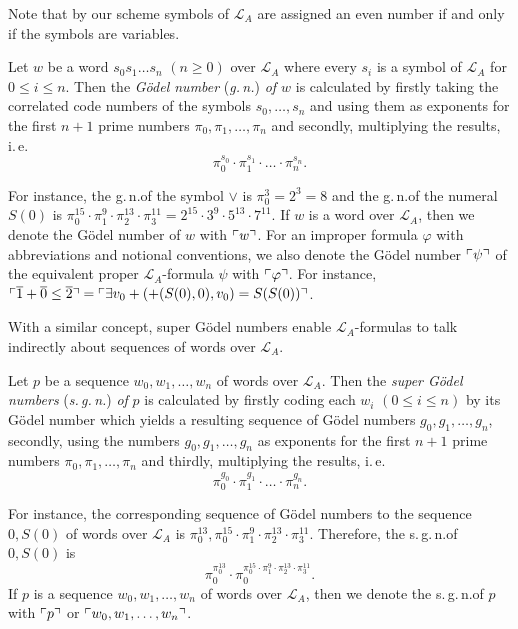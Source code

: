 Note that by our scheme symbols of $\mathcal{L}_A$ are assigned an even number if and only if the symbols are variables. 

\begin{dfn}
Let $w$ be a word $s_0 s_1 \ldots s_n$ $(n \ge 0)$ over $\mathcal{L}_A$ where every $s_i$ is a symbol of $\mathcal{L}_A$ for $ 0 \le i \le n$. Then the \textit{G\"odel number} (\textit{g.\,n.\@}) \textit{of $w$} is calculated by firstly taking the correlated code numbers of the symbols $s_0, \ldots, s_n$ and using them as exponents for the first $n+1$ prime numbers $\pi_0, \pi_1, \ldots, \pi_n$ and secondly, multiplying the results, i.\,e.\@ \[\pi_0^{s_0} \cdot \pi_1^{s_1}\cdot \ldots \cdot \pi_n^{s_n}. \]  
\end{dfn}

For instance, the g.\,n.\@ of the symbol $\vee$ is $\pi_0^3= 2^3=8$ and the g.\,n.\@ of the numeral $S(0)$ is $\pi_0^{15} \cdot \pi_1^{9} \cdot \pi_2^{13}  \cdot \pi_3^{11} = 2^{15} \cdot 3^{9} \cdot 5^{13} \cdot 7^{11}$. If $w$ is a word over $\mathcal{L}_A$, then we denote the G\"odel number of $w$ with $\ulcorner w \urcorner$. For an improper formula $\varphi$ with abbreviations and notional conventions, we also denote the G\"odel number $\ulcorner \psi \urcorner$ of the equivalent proper $\mathcal{L}_A$-formula $\psi$ with $\ulcorner \varphi \urcorner $. For instance, $\ulcorner \overline{1}+\overline{0} \le \overline{2} \urcorner = \ulcorner \exists v_0 +(+(S(0),0),v_0) = S(S(0)) \urcorner$.

With a similar concept, super G\"odel numbers enable $\mathcal{L}_A$-formulas to talk indirectly about sequences of words over $\mathcal{L}_A$.
 
\begin{dfn}
Let $p$ be a sequence $w_0, w_1, \ldots, w_n$ of words over $\mathcal{L}_A$. Then the \textit{super G\"odel numbers} (\textit{s.\,g.\,n.\@}) \textit{of} $p$ is calculated by firstly coding each $w_i$ $(0 \le i \le n)$ by its G\"odel number which yields a resulting sequence of G\"odel numbers $ g_0, g_1, \ldots, g_n$, secondly, using the numbers $g_0, g_1, \ldots, g_n$ as exponents for the first $n+1$ prime numbers $\pi_0, \pi_1, \ldots, \pi_n$ and thirdly, multiplying the results, i.\,e.\@
\[\pi_0^{g_0}\cdot \pi_1^{g_1} \cdot \ldots \cdot \pi_n^{g_n}. \]
\end{dfn}

For instance, the corresponding sequence of G\"odel numbers to the sequence $0, S(0)$ of words over $\mathcal{L}_A$ is $\pi_0^{13}, \pi_0^{15} \cdot \pi_1^{9} \cdot \pi_2^{13}  \cdot \pi_3^{11}$. Therefore, the s.\,g.\,n.\@ of $0, S(0)$ is 
\[ \pi_0^{\pi_0^{13}} \cdot \pi_0^{\pi_0^{15} \cdot \pi_1^{9} \cdot \pi_2^{13}  \cdot \pi_3^{11} }. \]
If $p$ is a sequence $w_0, w_1, \ldots, w_n$ of words over $\mathcal{L}_A$, then we denote the s.\,g.\,n.\@ of $p$ with $\ulcorner p \urcorner$ or $\ulcorner w_0, w_1, \ldots, w_n \urcorner$.

